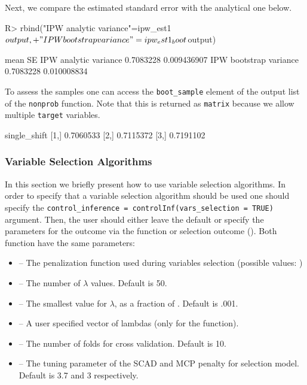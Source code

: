 \documentclass[
]{jss}
\begin{document}
Next, we compare the estimated standard error with the analytical one
below.

\begin{CodeChunk}
\begin{CodeInput}
R> rbind("IPW analytic variance"=ipw_est1$output,
+       "IPW bootstrap variance"=ipw_est1_boot$output)
\end{CodeInput}
\begin{CodeOutput}
                            mean          SE
IPW analytic variance  0.7083228 0.009436907
IPW bootstrap variance 0.7083228 0.010008834
\end{CodeOutput}
\end{CodeChunk}

To assess the samples one can access the \texttt{boot\_sample} element
of the output list of the \texttt{nonprob} function. Note that this is
returned as \texttt{matrix} because we allow multiple \texttt{target}
variables.

\begin{CodeChunk}
\begin{CodeOutput}
     single_shift
[1,]    0.7060533
[2,]    0.7115372
[3,]    0.7191102
\end{CodeOutput}
\end{CodeChunk}

\subsubsection{Variable Selection
Algorithms}\label{variable-selection-algorithms}

In this section we briefly present how to use variable selection
algorithms. In order to specify that a variable selection algorithm
should be used one should specify the
\texttt{control\_inference\ =\ controlInf(vars\_selection\ =\ TRUE)}
argument. Then, the user should either leave the default or specify the
parameters for the outcome via the  function or
selection outcome (). Both function have the same
parameters:

\begin{itemize}
\item {} -- The penalization function used during variables selection (possible values: )
\item {} -- The number of $\lambda$ values. Default is 50.
\item {} -- The smallest value for $\lambda$, as a fraction of . Default is .001.
\item {} -- A user specified vector of lambdas (only for the  function).
\item {} -- The number of folds for cross validation. Default is 10.
\item {} -- The tuning parameter of the SCAD and MCP penalty for selection model. Default is 3.7 and 3 respectively.
\end{itemize}
\end{document}
